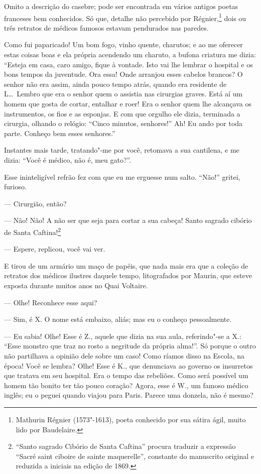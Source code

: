 Omito a descrição do casebre; pode ser encontrada em vários antigos
poetas franceses bem conhecidos. Só que, detalhe não percebido por
Régnier,\protect\footnote{  Mathurin Régnier (1573"-1613), poeta conhecido por sua sátira ágil,
muito lido por Baudelaire.} dois ou três retratos de médicos famosos
estavam pendurados nas paredes.

Como fui paparicado! Um bom fogo, vinho quente, charutos; e ao me
oferecer estas coisas boas e ela própria acendendo um charuto, a bufona
criatura me dizia: “Esteja em casa, caro amigo, fique à
vontade. Isto vai lhe lembrar o hospital e os bons tempos da juventude. 
Ora essa! Onde arranjou esses
cabelos brancos? O senhor não era assim, ainda pouco tempo atrás,
quando era residente de L\ldots\  Lembro que era o senhor quem o assistia nas
cirurgias graves. Está aí um homem que gosta de cortar, entalhar e
roer! Era o senhor quem lhe alcançava os instrumentos, os fios e as
esponjas. E com que orgulho ele dizia, terminada a cirurgia,
olhando o relógio: “Cinco minutos,
senhores!'' Ah! Eu ando por toda parte. Conheço bem
esses senhores.''

Instantes mais tarde, tratando"-me por você, retomava a sua
cantilena, e me dizia: “Você é médico, não é, meu
gato?''.

Esse ininteligível refrão fez com que eu me erguesse num salto.
``Não!'' gritei, furioso.

--- Cirurgião, então?

--- Não! Não! A não ser que seja para cortar a sua cabeça! Santo
sagrado cibório de Santa Caftina!\protect\footnote{   ``Santo sagrado Cibório de Santa Caftina''
procura traduzir a expressão ``Sacré saint ciboire de
sainte maquerelle'', constante do manuscrito original e
reduzida a iniciais na edição de 1869.}

--- Espere, replicou, você vai ver.

E tirou de um armário um maço de papéis, que nada mais era que a
coleção de retratos dos médicos ilustres daquele tempo, litografados
por Maurin, que esteve exposta durante muitos anos no Quai
Voltaire.

--- Olhe! Reconhece esse aqui?

--- Sim, é X. O nome está embaixo, aliás; mas eu o conheço
pessoalmente.

--- Eu sabia! Olhe! Esse é Z., aquele que dizia na sua aula,
referindo"-se a X.: “Esse monstro que traz no rosto a
negritude da própria alma!''. Só porque o outro não
partilhava a opinião dele sobre um caso! Como ríamos disso na
Escola, na época! Você se lembra? Olhe! Esse é K., que
denunciava ao governo os insurretos que tratava em seu hospital. Era o
tempo das rebeliões. Como será possível um homem tão bonito ter tão
pouco coração? Agora, esse é W., um famoso médico inglês; eu o
peguei quando viajou para Paris. Parece uma donzela, não é
mesmo?

